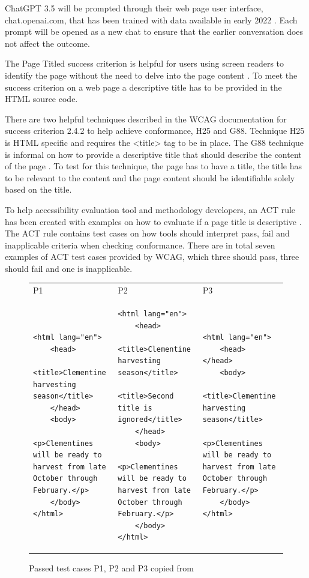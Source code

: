 ChatGPT 3.5 will be prompted through their web page user interface, chat.openai.com, that has been trained with data available in early 2022 \citep{openai_35}. Each prompt will be opened as a new chat to ensure that the earlier conversation does not affect the outcome.

The Page Titled success criterion is helpful for users using screen readers to identify the page without the need to delve into the page content \citep{wcag_page_titled}. To meet the success criterion on a web page a descriptive title has to be provided in the HTML source code. 

There are two helpful techniques described in the WCAG documentation for success criterion 2.4.2 to help achieve conformance, H25 and G88. Technique H25 is HTML specific and requires the <title> tag to be in place. The G88 technique is informal on how to provide a descriptive title that should describe the content of the page \citep{g88}. To test for this technique, the page has to have a title, the title has to be relevant to the content and the page content should be identifiable solely based on the title.

To help accessibility evaluation tool and methodology developers, an ACT rule has been created with examples on how to evaluate if a page title is descriptive \citep{act_rule_g88}. The ACT rule contains test cases on how tools should interpret pass, fail and inapplicable criteria when checking conformance. There are in total seven examples of ACT test cases provided by WCAG, which three should pass, three should fail and one is inapplicable.

\begin{figure}[htbp]
\caption{Passed test cases P1, P2 and P3 copied from \textcite{act_rule_g88}}
\label{passed_cases}
\begin{tabular}{|p{4.9cm}|p{4.9cm}|p{4.9cm}|}
P1 & P2 & P3 \\
\begin{lstlisting}
<html lang="en">
	<head>
		<title>Clementine harvesting season</title>
	</head>
	<body>
		<p>Clementines will be ready to harvest from late October through February.</p>
	</body>
</html>
\end{lstlisting}&
\begin{lstlisting}
<html lang="en">
	<head>
		<title>Clementine harvesting season</title>
		<title>Second title is ignored</title>
	</head>
	<body>
		<p>Clementines will be ready to harvest from late October through February.</p>
	</body>
</html>
\end{lstlisting}&
\begin{lstlisting}
<html lang="en">
	<head> </head>
	<body>
		<title>Clementine harvesting season</title>
		<p>Clementines will be ready to harvest from late October through February.</p>
	</body>
</html>
\end{lstlisting}
\end{tabular}
\end{figure}

